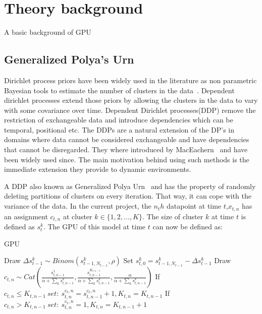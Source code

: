 \documentclass[twoside,hidelinks]{article}
\begin{document}
\section{Theory background}
\label{sec:theory}

A basic background of GPU

\subsection{Generalized Polya's Urn}
Dirichlet process priors have been widely used in the literature as non parametric Bayesian tools to estimate the number of clusters in the data~\cite{antoniak}. Dependent dirichlet processes extend those priors by allowing the clusters in the data to vary with some covariance over time. Dependent Dirichlet processes(DDP) remove the restriction of exchangeable data and introduce dependencies which can be temporal, positional etc. The DDPs are a natural extension of the DP's in domains where data cannot be considered exchangeable and have dependencies that cannot be disregarded. They where introduced by MacEachern~\cite{theory:ddp} and have been widely used since. The main motivation behind using such methods is the immediate extension they provide to dynamic environments. 

A DDP also known as Generalized Polya Urn~\cite{caron} and has the property of randomly deleting partitions of clusters on every iteration. That way, it can cope with the variance of the data. In the current project, the $n_th$ datapoint at time $t$,$x_{t,n}$ has an assignment $c_{t,n}$ at cluster $k \in \{1,2,..., K\} $. The size of cluster $k$ at time $t$ is defined as $s_t^k$. The GPU of this model at time $t$ can now be defined as:



\begin{algorithm}
  \caption{GPU}\label{GPU}
  \begin{algorithmic}[1]

	      \State Draw $\Delta s_{t-1}^k \sim Binom(s_{t-1,N_{t-1}}^k, \rho) $ 
	      \State Set $s_{t,0}^{k} = s_{t-1,N_{t-1}}^{k} -\Delta s_{t-1}^k$
      \EndFor
      	    \State Draw $c_{t,n} \sim Cat( \frac{ s_{t,n-1}^{1} }{\alpha + \sum_k s_{t,n-1}^{k} }, \frac{ s_{t,n-1}^{K_{t,n-1}} }{\alpha + \sum_k s_{t,n-1}^{k} } , \frac{ \alpha}{\alpha + \sum_k s_{t,n-1}^{k} }) $
      	    \State If $c_{t,n} \leq K_{t,n-1}\ set:\ s_{t,n}^{c_t,n} = s_{t,n-1}^{c_t,n} + 1 , K_{t,n} = K_{t,n-1}$
      	    \State If $c_{t,n} > K_{t,n-1}\ set:\ s_{t,n}^{c_t,n} = 1 , K_{t,n} = K_{t,n-1} + 1$
      \EndFor
    \EndProcedure
  \end{algorithmic}
\end{algorithm}
\end{document}
